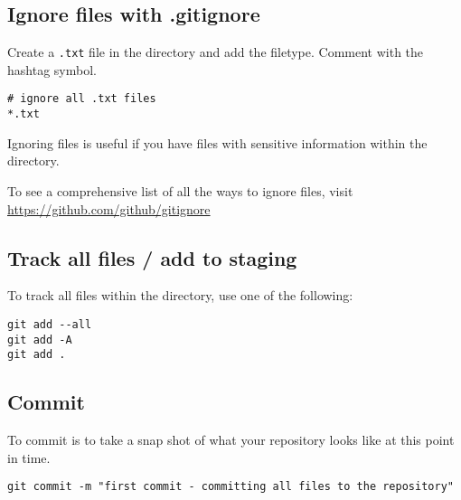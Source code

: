 \documentclass[12pt]{article}
\begin{document}
\subsection*{Ignore files with {\ttfamily .gitignore}}
Create a \verb|.txt| file in the directory and add the filetype. Comment with the hashtag symbol.
\begin{Verbatim}[frame=single]
# ignore all .txt files
*.txt
\end{Verbatim}
Ignoring files is useful if you have files with sensitive information within the directory.\par
To see a comprehensive list of all the ways to ignore files, visit \href{https://github.com/github/gitignore}{https://github.com/github/gitignore}

\subsection*{Track all files / add to staging}
To track all files within the directory, use one of the following:
\begin{Verbatim}
git add --all
git add -A
git add .
\end{Verbatim}


\subsection*{Commit}
To commit is to take a snap shot of what your repository looks like at this point in time.
\begin{Verbatim}
git commit -m "first commit - committing all files to the repository"
\end{Verbatim}
\end{document}
